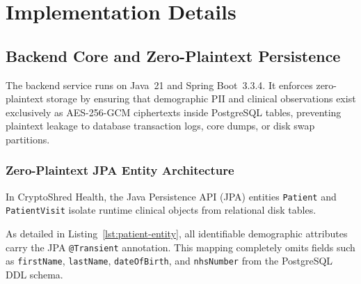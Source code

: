 
\chapter{Implementation Details}\label{section:implementation}


\section{Backend Core and Zero-Plaintext Persistence}\label{section:impl-backend}

The backend service runs on Java~21 and Spring Boot~3.3.4. It enforces zero-plaintext storage by ensuring that demographic PII and clinical observations exist exclusively as AES-256-GCM ciphertexts inside PostgreSQL tables, preventing plaintext leakage to database transaction logs, core dumps, or disk swap partitions.

\subsection{Zero-Plaintext JPA Entity Architecture}

In CryptoShred Health, the Java Persistence API (JPA) entities \texttt{Patient} and \texttt{PatientVisit} isolate runtime clinical objects from relational disk tables.

As detailed in Listing~\ref{lst:patient-entity}, all identifiable demographic attributes carry the JPA \texttt{@Transient} annotation. This mapping completely omits fields such as \texttt{firstName}, \texttt{lastName}, \texttt{dateOfBirth}, and \texttt{nhsNumber} from the PostgreSQL DDL schema.

